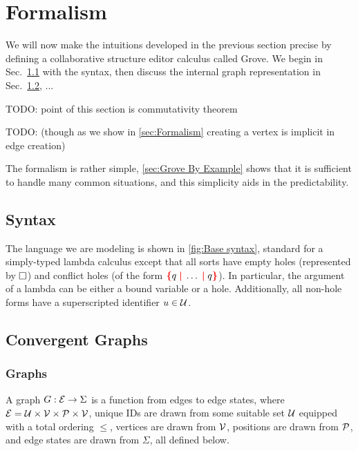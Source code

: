 
\section{Formalism}%
\label{sec:Formalism}

We will now make the intuitions developed in the previous section precise
by defining a collaborative structure editor calculus called Grove.
We begin in Sec.~\ref{sub:Syntax} with the syntax, then discuss
the internal graph representation in Sec.~\ref{sub:Convergent Graphs},
...


TODO: point of this section is commutativity theorem

TODO: (though as we show in \autoref{sec:Formalism} creating a vertex is implicit in edge creation)

The formalism is rather simple, \autoref{sec:Grove By Example} shows
that it is sufficient to handle many common situations,
and this simplicity aids in the predictability.

\figureTermSyntax

\subsection{Syntax}%
\label{sub:Syntax}

The language we are modeling is shown in \autoref{fig:Base syntax}, standard for a simply-typed lambda calculus except that all sorts have empty holes (represented by $\hole$) and conflict holes (of the form $\conflictHole{q,\ldots,q}$).
In particular, the argument of a lambda can be either a bound variable or a hole.
Additionally, all non-hole forms have a superscripted identifier $u \in \U$.



\figureArity

\subsection{Convergent Graphs}%
\label{sub:Convergent Graphs}

\subsubsection{Graphs}%
\label{sub:Graphs}

A graph $G : \E \rightarrow \Sigma$ is a function from edges to edge states,
where $\E = \U \times \V \times \P \times \V$,
unique IDs are drawn from some suitable set $\U$ equipped with a total ordering $\leq$,
vertices are drawn from $\V$,
positions are drawn from $\P$,
and edge states are drawn from $\Sigma$, all defined below.


